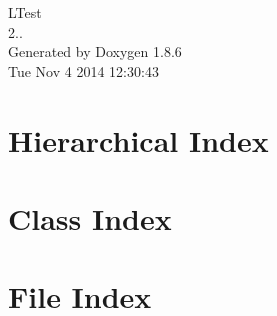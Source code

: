 \documentclass[twoside]{book}
\newcommand{\clearemptydoublepage}{%
  \newpage{\pagestyle{empty}\cleardoublepage}%
}
\begin{document}
\hypersetup{pageanchor=false}
\begin{titlepage}
\vspace*{7cm}
\begin{center}%
{\Large L\-Test \\[1ex]\large 2.. }\\
\vspace*{1cm}
{\large Generated by Doxygen 1.8.6}\\
\vspace*{0.5cm}
{\small Tue Nov 4 2014 12:30:43}\\
\end{center}
\end{titlepage}
\clearemptydoublepage
\tableofcontents
\clearemptydoublepage
{}
\hypersetup{pageanchor=true}

\chapter{Hierarchical Index}

\chapter{Class Index}

\chapter{File Index}

\end{document}

